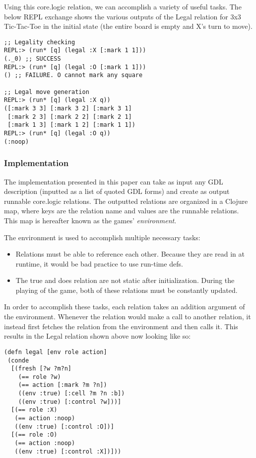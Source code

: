 \documentclass[letterpaper]{article}
\begin{document}
Using this core.logic relation, we can accomplish a variety of useful tasks. The below REPL exchange shows the various outputs of the Legal relation for 3x3 Tic-Tac-Toe in the initial state (the entire board is empty and X's turn to move).

\begin{lstlisting}[frame=single,caption=REPL exchange with the core.logic Legal relation for 3x3 Tic-Tac-Toe in the initial state]
;; Legality checking
REPL:> (run* [q] (legal :X [:mark 1 1]))
(._0) ;; SUCCESS
REPL:> (run* [q] (legal :O [:mark 1 1]))
() ;; FAILURE. O cannot mark any square

;; Legal move generation
REPL:> (run* [q] (legal :X q))
([:mark 3 3] [:mark 3 2] [:mark 3 1]
 [:mark 2 3] [:mark 2 2] [:mark 2 1]
 [:mark 1 3] [:mark 1 2] [:mark 1 1])
REPL:> (run* [q] (legal :O q))
(:noop)
\end{lstlisting}
\subsubsection{Implementation}

The implementation presented in this paper can take as input any GDL description (inputted as a list of quoted GDL forms) and create as output runnable core.logic relations. The outputted relations are organized in a Clojure map, where keys are the relation name and values are the runnable relations. This map is hereafter known as the games' \emph{environment}.

The environment is used to accomplish multiple necessary tasks:

\begin{itemize}
\item Relations must be able to reference each other. Because they are read in at runtime, it would be bad practice to use run-time defs.
\item The true and does relation are not static after initialization. During the playing of the game, both of these relations must be constantly updated.
\end{itemize}

 In order to accomplish these tasks, each relation takes an addition argument of the environment. Whenever the relation would make a call to another relation, it instead first fetches the relation from the environment and then calls it. This results in the Legal relation shown above now looking like so:

\begin{lstlisting}[frame=single, caption=The Legal relation translated into core.logic]
(defn legal [env role action]
 (conde
  [(fresh [?w ?m?n]
    (== role ?w)
    (== action [:mark ?m ?n])
    ((env :true) [:cell ?m ?n :b])
    ((env :true) [:control ?w]))]
  [(== role :X)
   (== action :noop)
   ((env :true) [:control :O])]
  [(== role :O)
   (== action :noop)
   ((env :true) [:control :X])]))
\end{lstlisting}
\end{document}
